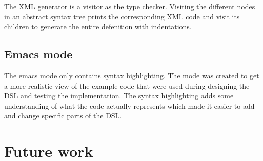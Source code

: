 The XML generator is a visitor as the type checker. Visiting the
different nodes in an abstract syntax tree prints the corresponding
XML code and visit its children to generate the entire defenition with
indentations.

\subsection{Emacs mode}\label{sec:emacs}
The emacs mode only contains syntax highlighting. The mode was created
to get a more realistic view of the example code that were used during
designing the DSL and testing the implementation. The syntax
highlighting adds some understanding of what the code actually
represents which made it easier to add and change specific parts of
the DSL.

\section{Future work}


